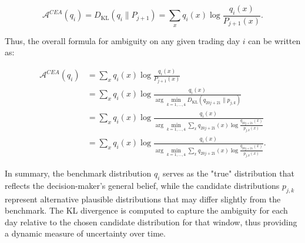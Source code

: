 \documentclass[preprint,12pt,authoryear]{elsarticle}
\begin{document}
\[
\mathcal{A}^{CEA}(q_i) =  D_{\mathrm{KL}}(q_i \parallel P_{j+1}) = \sum_{x} q_i(x) \log \frac{q_i(x)}{P_{j+1}(x)}.
\]

Thus, the overall formula for ambiguity on any given trading day \(i\) can be written as:

\[
\begin{aligned}
\mathcal{A}^{CEA}(q_i) &= \sum_{x} q_i(x) \log \frac{q_i(x)}{P_{j+1}(x)} \\
&= \sum_{x} q_i(x) \log \frac{q_i(x)}{\arg\min_{k=1,\dots,4} D_{\mathrm{KL}}(q_{20j+21} \parallel p_{j,k})} \\
&= \sum_{x} q_i(x) \log \frac{q_i(x)}{\arg\min_{k=1,\dots,4} \sum_{x} q_{20j+21}(x) \log \frac{q_{20j+21}(x)}{p_{j,k}(x)}} \\
&= \sum_{x} q_i(x) \log \frac{q_i(x)}{\arg\min_{k=1,\dots,4} \sum_{x} q_{20j+21}(x) \log \frac{q_{20j+21}(x)}{p_{j,k}(x)}}.
\end{aligned}
\]

In summary, the benchmark distribution \(q_i\) serves as the "true" distribution that reflects the decision-maker's general belief, while the candidate distributions \(p_{j,k}\) represent alternative plausible distributions that may differ slightly from the benchmark. The KL divergence is computed to capture the ambiguity for each day relative to the chosen candidate distribution for that window, thus providing a dynamic measure of uncertainty over time.
\end{document}
